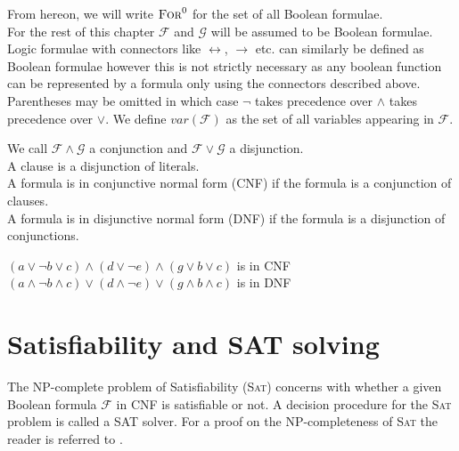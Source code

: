 From hereon, we will write $\textsc{For}^0$ for the set of all Boolean formulae.\\
For the rest of this chapter $\mathcal{F}$ and $\mathcal{G}$ will be assumed to be Boolean formulae.\\
Logic formulae with connectors like $\leftrightarrow$, $\rightarrow$ etc. can similarly be defined as Boolean formulae however this is not strictly necessary as any boolean function can be represented by a formula only using the connectors described above. Parentheses may be omitted in which case $\neg$ takes precedence over $\land$ takes precedence over $\lor$. We define $var(\mathcal{F})$ as the set of all variables appearing in  $\mathcal{F}$.
\begin{definition}
We call $\mathcal{F}\land\mathcal{G}$  a conjunction and $\mathcal{F}\lor\mathcal{G}$ a disjunction.\\
A clause is a disjunction of literals.\\
A formula is in conjunctive normal form (CNF) if the formula is a conjunction of clauses.\\
A formula is in disjunctive normal form (DNF) if the formula is a disjunction of conjunctions.
\end{definition}
\begin{example}
$\left(a \lor \neg b \lor c\right)\land\left(d \lor \neg e\right)\land\left(g \lor b \lor c\right)$ is in CNF\\
$\left(a \land \neg b \land c\right)\lor\left(d \land \neg e\right)\lor\left(g \land b \land c\right)$ is in DNF\\
\end{example}



\section{Satisfiability and SAT solving}
The \textsc{NP}-complete problem of Satisfiability (\textsc{Sat}) concerns with whether a given Boolean formula $\mathcal{F}$ in CNF is satisfiable or not.
A decision procedure for the \textsc{Sat} problem is called a SAT solver.
For a proof on the \textsc{NP}-completeness of \textsc{Sat} the reader is referred to \cite{Garey-Intractability}.

